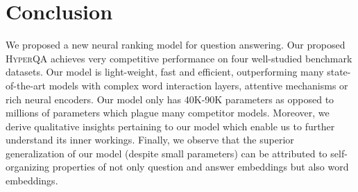 \documentclass[sigconf]{acmart}
\begin{document}
\section{Conclusion}
We proposed a new neural ranking model for question answering. Our proposed \textsc{HyperQA} achieves very competitive performance on four well-studied benchmark datasets. Our model is light-weight, fast and efficient, outperforming many state-of-the-art models with complex word interaction layers, attentive mechanisms or rich neural encoders. Our model only has 40K-90K parameters as opposed to millions of parameters which plague many competitor models. Moreover, we derive qualitative insights pertaining to our model which enable us to further understand its inner workings. Finally, we observe that the superior generalization of our model (despite small parameters) can be attributed to self-organizing properties of not only question and answer embeddings but also word embeddings. 
 



 
\end{document}
